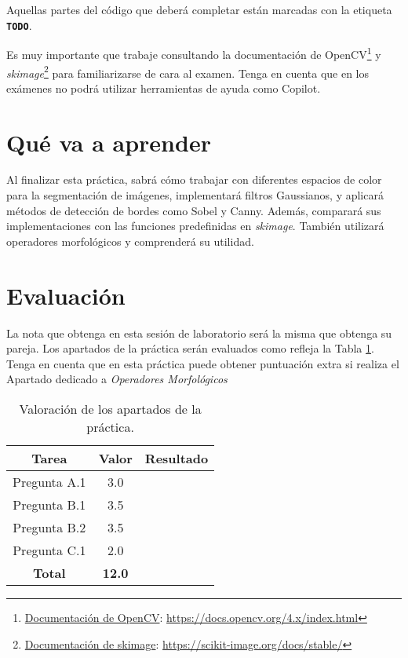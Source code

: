 Aquellas partes del código que deberá completar están marcadas con la etiqueta \textbf{\texttt{TODO}}.

Es muy importante que trabaje consultando la documentación de OpenCV\footnote{\href{https://docs.opencv.org/4.x/index.html}{Documentación de OpenCV}: \url{https://docs.opencv.org/4.x/index.html}} y \textit{skimage}\footnote{\href{https://scikit-image.org/docs/stable/}{Documentación de skimage}: \url{https://scikit-image.org/docs/stable/}} para familiarizarse de cara al examen. Tenga en cuenta que en los exámenes no podrá utilizar herramientas de ayuda como Copilot.

\section{Qué va a aprender}

Al finalizar esta práctica, sabrá cómo trabajar con diferentes espacios de color para la segmentación de imágenes, implementará filtros Gaussianos, y aplicará métodos de detección de bordes como Sobel y Canny. Además, comparará sus implementaciones con las funciones predefinidas en \textit{skimage}. También utilizará operadores morfológicos y comprenderá su utilidad.

\section{Evaluación}

La nota que obtenga en esta sesión de laboratorio será la misma que obtenga su pareja. Los apartados de la práctica serán evaluados como refleja la Tabla \ref{table:evaluacion}. Tenga en cuenta que en esta práctica puede obtener puntuación extra si realiza el Apartado dedicado a \textit{Operadores Morfológicos}

\begin{table}[h!]
    \centering
    \begin{tabular}{|c|c|c|}
    \hline
    \textbf{Tarea} & \textbf{Valor} & \textbf{Resultado} \\
    \hline
    Pregunta A.1 & 3.0 & \\
    \hline
    Pregunta B.1 & 3.5 & \\
    \hline
    Pregunta B.2 & 3.5 & \\
    \hline
    Pregunta C.1 & 2.0 & \\
    \hline
    \textbf{Total} & \textbf{12.0} & \\
    \hline
    \end{tabular}
    \caption{Valoración de los apartados de la práctica.}
    \label{table:evaluacion}
\end{table}
